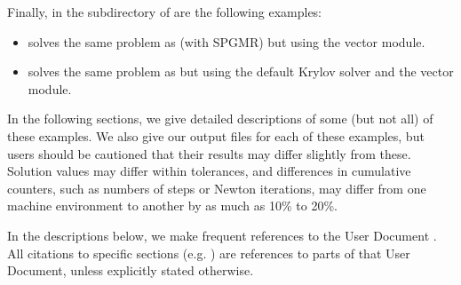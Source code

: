



\vspace{0.2in}\noindent
Finally, in the subdirectory  of  are the
following examples:
\begin{itemize}
\item {} solves the same problem as 
      (with SPGMR) but using the {\petsc} vector module.
\item {} solves the same problem as 
      but using the default {\petsc} Krylov solver and the {\petsc} vector module.
\end{itemize}

\vspace{0.2in}\noindent 
In the following sections, we give detailed descriptions of some (but
not all) of these examples.  We also give our output files for
each of these examples, but users should be cautioned that their
results may differ slightly from these.  Solution
values may differ within tolerances, and differences in cumulative
counters, such as numbers of steps or Newton iterations, may differ
from one machine environment to another by as much as 10\% to 20\%.

In the descriptions below, we make frequent references to the {\ida}
User Document \cite{ida_ug}.  All citations to specific sections
(e.g. ) are references to parts of that User Document, unless
explicitly stated otherwise.

